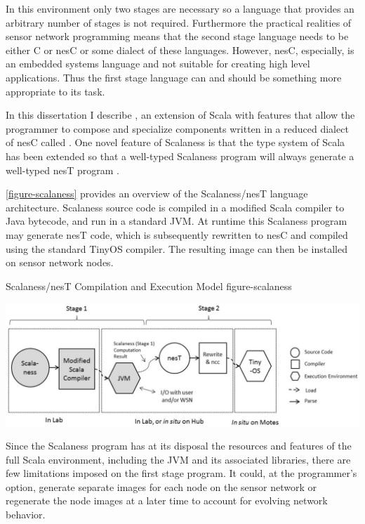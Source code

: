 In this environment only two stages are necessary so a language that provides an arbitrary
number of stages is not required. Furthermore the practical realities of sensor network
programming means that the second stage language needs to be either C or nesC or some dialect of
these languages. However, nesC, especially, is an embedded systems language and not suitable for
creating high level applications. Thus the first stage language can and should be something
more appropriate to its task.

In this dissertation I describe , an extension of Scala \cite{PiS2} with
features that allow the programmer to compose and specialize components written in a reduced
dialect of nesC called . One novel feature of Scalaness is that the type system of
Scala has been extended so that a well-typed Scalaness program will always generate a well-typed
nesT program \cite{chapin-GPCE-2013}.

\autoref{figure-scalaness} provides an overview of the Scalaness/nesT language
architecture. Scalaness source code is compiled in a modified Scala compiler to Java bytecode,
and run in a standard JVM. At runtime this Scalaness program may generate nesT code, which is
subsequently rewritten to nesC and compiled using the standard TinyOS compiler. The resulting
image can then be installed on sensor network nodes.

\begin{fpfig*}[t]
  {Scalaness/nesT Compilation and Execution Model}
  {figure-scalaness}
  \begin{center}
    \includegraphics[scale=.54]{Figures/scalaness.eps}
  \end{center}
\end{fpfig*}

Since the Scalaness program has at its disposal the resources and features of the full Scala
environment, including the JVM and its associated libraries, there are few limitations imposed
on the first stage program. It could, at the programmer's option, generate separate images for
each node on the sensor network or regenerate the node images at a later time to account for
evolving network behavior.


